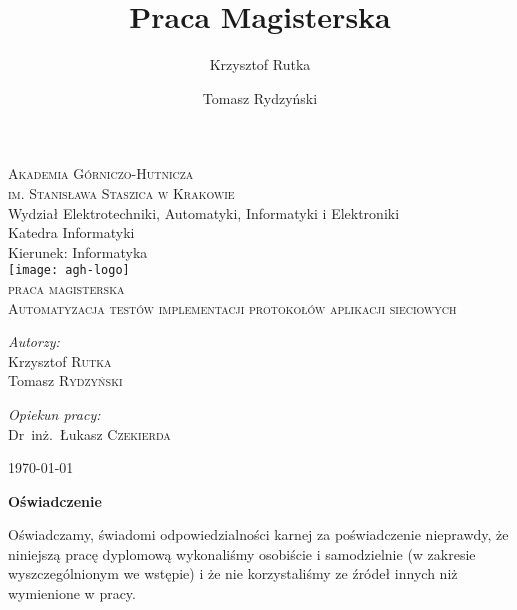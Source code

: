 \documentclass[a4paper,oneside,12pt]{mwbk}
\title{Praca Magisterska}
\author{Krzysztof Rutka \and Tomasz Rydzyński}
\begin{document}
\frontmatter

\begin{titlepage}

\begin{center}

\textsc{\LARGE Akademia Górniczo-Hutnicza\\ \Large im. Stanisława Staszica w Krakowie}\\[0.5cm]

Wydział Elektrotechniki, Automatyki, Informatyki i Elektroniki\\
Katedra Informatyki\\
Kierunek: Informatyka\\[1.5cm]

\texttt{[image: agh-logo]}\\[1.0cm]    

\textsc{\Large praca magisterska}\\[0.5cm]


\textsc{\LARGE Automatyzacja testów implementacji protokołów aplikacji sieciowych}\\[0.4cm]

\vfill

\begin{minipage}[t]{0.49\textwidth}
\begin{flushleft} \large
\emph{Autorzy:}\\
Krzysztof \textsc{Rutka} \\
Tomasz \textsc{Rydzyński} \\
\end{flushleft}
\end{minipage}
\begin{minipage}[t]{0.49\textwidth}
\begin{flushright} \large
\emph{Opiekun pracy:} \\
Dr~inż.~Łukasz \textsc{Czekierda}
\vfill
\end{flushright}
\end{minipage}

\vfill

{\large \today}

\end{center}

\end{titlepage}

\clearpage
\thispagestyle{empty}
{\textbf{\Large{Oświadczenie}}}

Oświadczamy, świadomi odpowiedzialności karnej za poświadczenie nieprawdy, że
niniejszą pracę dyplomową wykonaliśmy osobiście i samodzielnie (w zakresie
wyszczególnionym we wstępie) i że nie korzystaliśmy ze źródeł innych niż
wymienione w pracy.
\clearpage
\end{document}
